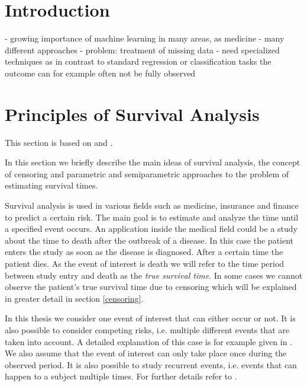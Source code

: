 \documentclass[12pt, a4paper]{scrartcl}
\theoremstyle{definition}
\theoremstyle{plain}
\numberwithin{equation}{section}
\numberwithin{figure}{section}
\numberwithin{table}{section}
\begin{document}
	
	\thispagestyle{plain}
	\tableofcontents
	\newpage

	
	\section{Introduction} \label{introduction}
	- growing importance of machine learning in many areas, as medicine
	- many different approaches
	- problem: treatment of missing data
	- need specialized techniques as in contrast to standard regression or classification tasks the outcome can for example often not be fully observed
	
	\newpage
	
	\section{Principles of Survival Analysis}
	This section is based on \citet*{sabook} and \citet*{mathsabook}.
	
	In this section we briefly describe the main ideas of survival analysis, the concept of censoring and parametric and semiparametric approaches to the problem of estimating survival times.
	
	Survival analysis is used in various fields such as medicine, insurance and finance to predict a certain risk.
	The main goal is to estimate and analyze the time until a specified event occurs.
	An application inside the medical field could be a study about the time to death after the outbreak of a disease.
	In this case the patient enters the study as soon as the disease is diagnosed.
	After a certain time the patient dies.
	As the event of interest is death we will refer to the time period between study entry and death as the \emph{true survival time}.
	In some cases we cannot observe the patient's true survival time due to censoring which will be explained in greater detail in section \ref{censoring}.
	
	In this thesis we consider one event of interest that can either occur or not.
	It is also possible to consider competing risks, i.e. multiple different events that are taken into account.
	A detailed explanation of this case is for example given in \citet*[chapter~8]{bookfailuretime}.
	We also assume that the event of interest can only take place once during the observed period.
	It is also possible to study recurrent events, i.e. events that can happen to a subject multiple times.
	For further details refer to \citet*[chapter~9]{bookfailuretime}.
	
\end{document}
